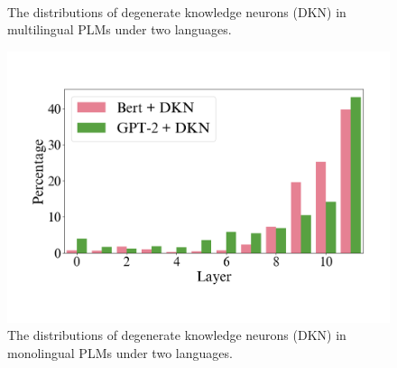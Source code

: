 \documentclass[]{article}
\begin{document}
\begin{figure}[h]
\centering
{}
\\
\caption{The distributions of degenerate knowledge neurons (DKN) in multilingual PLMs under two languages.}
\label{fig:d}
\end{figure}
\begin{figure}[h]
\centering
\includegraphics[width=0.8\linewidth]{figures/mono-d.pdf}
\caption{The distributions of degenerate knowledge neurons (DKN) in monolingual PLMs under two languages.}
\label{fig:mono-D-neurons_distribution}
\end{figure}
\end{document}
